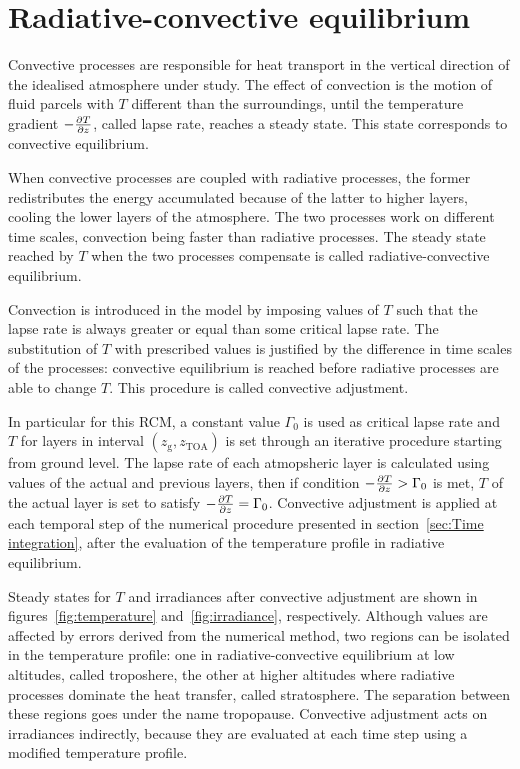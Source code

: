 \documentclass[a4paper,10pt,twocolumn,\classoptions]{article}
\newcommand{\zTOA}{z_\text{TOA}}
\begin{document}
\section{Radiative-convective equilibrium}
\label{sec:Radiative-convective equilibrium}
Convective processes are responsible for heat transport in the vertical direction of the idealised atmosphere under study. The effect of convection is the motion of fluid parcels with $T$ different than the surroundings, until the temperature gradient $-\pdv{T}{z}$, called lapse rate, reaches a steady state. This state corresponds to convective equilibrium.

When convective processes are coupled with radiative processes, the former redistributes the energy accumulated because of the latter to higher layers, cooling the lower layers of the atmosphere. The two processes work on different time scales, convection being faster than radiative processes. The steady state reached by $T$ when the two processes compensate is called radiative-convective equilibrium.

Convection is introduced in the model by imposing values of $T$ such that the lapse rate is always greater or equal than some critical lapse rate. The substitution of $T$ with prescribed values is justified by the difference in time scales of the processes: convective equilibrium is reached before radiative processes are able to change $T$. This procedure is called convective adjustment.

In particular for this RCM, a constant value $\Gamma_0$ is used as critical lapse rate and $T$ for layers in interval $(z_\text{g}, \zTOA)$ is set through an iterative procedure starting from ground level. The lapse rate of each atmopsheric layer is calculated using values of the actual and previous layers, then if condition $-\pdv{T}{z} > \Gamma_0$ is met, $T$ of the actual layer is set to satisfy $-\pdv{T}{z} = \Gamma_0$. Convective adjustment is applied at each temporal step of the numerical procedure presented in section~\ref{sec:Time integration}, after the evaluation of the temperature profile in radiative equilibrium.

Steady states for $T$ and irradiances after convective adjustment are shown in figures~\ref{fig:temperature} and~\ref{fig:irradiance}, respectively. Although values are affected by errors derived from the numerical method, two regions can be isolated in the temperature profile: one in radiative-convective equilibrium at low altitudes, called troposhere, the other at higher altitudes where radiative processes dominate the heat transfer, called stratosphere. The separation between these regions goes under the name tropopause. Convective adjustment acts on irradiances indirectly, because they are evaluated at each time step using a modified temperature profile.
\end{document}
